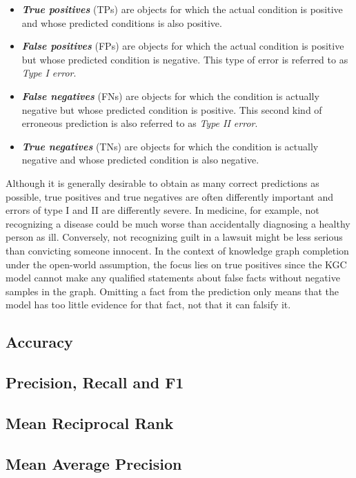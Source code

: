 \begin{itemize}
    \item \textbf{\emph{True positives}} (TPs) are objects for which the actual condition is positive and whose predicted conditions is also positive.

    \item \textbf{\emph{False positives}} (FPs) are objects for which the actual condition is positive but whose predicted condition is negative. This type of error is referred to as \emph{Type I error}.

    \item \textbf{\emph{False negatives}} (FNs) are objects for which the condition is actually negative but whose predicted condition is positive. This second kind of erroneous prediction is also referred to as \emph{Type II error}.

    \item \textbf{\emph{True negatives}} (TNs) are objects for which the condition is actually negative and whose predicted condition is also negative.
\end{itemize}

Although it is generally desirable to obtain as many correct predictions as possible, true positives and true negatives are often differently important and errors of type I and II are differently severe. In medicine, for example, not recognizing a disease could be much worse than accidentally diagnosing a healthy person as ill. Conversely, not recognizing guilt in a lawsuit might be less serious than convicting someone innocent. In the context of knowledge graph completion under the open-world assumption, the focus lies on true positives since the KGC model cannot make any qualified statements about false facts without negative samples in the graph. Omitting a fact from the prediction only means that the model has too little evidence for that fact, not that it can falsify it.

\subsection{Accuracy}
\label{subsec:2_basics/2_metrics/1_accuracy}


\subsection{Precision, Recall and F1}
\label{subsec:2_basics/2_metrics/2_prf}


\subsection{Mean Reciprocal Rank}
\label{subsec:2_basics/2_metrics/3_mrr}


\subsection{Mean Average Precision}
\label{subsec:2_basics/2_metrics/4_map}

